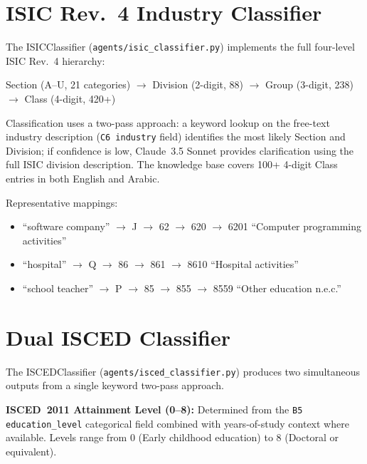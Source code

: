 \section{ISIC Rev.~4 Industry Classifier}
\label{sec:arch-isic}

The ISICClassifier (\texttt{agents/\-isic\_\-classifier.\-py}) implements the full
four-level ISIC Rev.~4 hierarchy:

\begin{center}
Section (A--U, 21 categories) $\to$ Division (2-digit, 88) $\to$
Group (3-digit, 238) $\to$ Class (4-digit, 420+)
\end{center}

Classification uses a two-pass approach: a keyword lookup on the free-text
industry description (\texttt{C6 industry} field) identifies the most likely
Section and Division; if confidence is low, Claude~3.5 Sonnet provides
clarification using the full ISIC division description.
The knowledge base covers 100+ 4-digit Class entries in both English and Arabic.

Representative mappings:
\begin{itemize}
  \item ``software company'' $\to$ J $\to$ 62 $\to$ 620 $\to$
  6201 ``Computer programming activities''
  \item ``hospital'' $\to$ Q $\to$ 86 $\to$ 861 $\to$
  8610 ``Hospital activities''
  \item ``school teacher'' $\to$ P $\to$ 85 $\to$ 855 $\to$
  8559 ``Other education n.e.c.''
\end{itemize}

\section{Dual ISCED Classifier}
\label{sec:arch-isced}

The ISCEDClassifier (\texttt{agents/\-isced\_\-classifier.\-py}) produces two
simultaneous outputs from a single keyword two-pass approach.

\textbf{ISCED~2011 Attainment Level (0--8):}
Determined from the \texttt{B5 education\_level} categorical field combined
with years-of-study context where available.
Levels range from 0 (Early childhood education) to 8 (Doctoral or equivalent).

